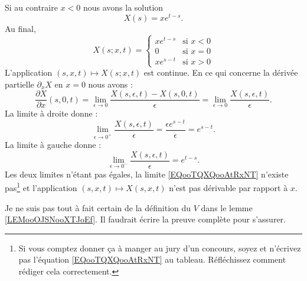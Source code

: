 \begin{example}
	Si au contraire \( x<0 \) nous avons la solution
	\begin{equation}
		X(s)=x e^{t-s}.
	\end{equation}
	Au final,
	\begin{equation}
		X(s;x,t)=
		\begin{cases}
			x e^{t-s} & \text{si } x<0 \\
			0         & \text{si }x=0  \\
			x e^{s-t} & \text{si }x>0
		\end{cases}
	\end{equation}
	L'application \( (s,x,t)\mapsto X(s;x,t)\) est continue. En ce qui concerne la dérivée partielle \( \partial_xX\) en \( x=0\) nous avons :
	\begin{equation}        \label{EQooTQXQooAtRxNT}
		\frac{ \partial X }{ \partial x }(s,0,t)=\lim_{\epsilon\to 0}\frac{ X(s,\epsilon,t)-X(s,0,t) }{ \epsilon }=\lim_{\epsilon\to 0}\frac{ X(s,\epsilon,t) }{ \epsilon }.
	\end{equation}
	La limite à droite donne :
	\begin{equation}
		\lim_{\epsilon\to 0^+}\frac{ X(s,\epsilon,t) }{ \epsilon }=\frac{ \epsilon e^{s-t} }{ \epsilon }= e^{s-t}.
	\end{equation}
	La limite à gauche donne :
	\begin{equation}
		\lim_{\epsilon\to 0^-}\frac{ X(s,\epsilon,t) }{ \epsilon }= e^{t-s}.
	\end{equation}
	Les deux limites n'étant pas égales, la limite \eqref{EQooTQXQooAtRxNT} n'existe pas\footnote{Si vous comptez donner ça à manger au jury d'un concours, soyez  et n'écrivez pas l'équation \eqref{EQooTQXQooAtRxNT} au tableau. Réfléchissez comment rédiger cela correctement.} et l'application \( (s,x,t)\mapsto X(s,x,t) \) n'est pas dérivable par rapport à \( x\).
\end{example}

\begin{probleme}		\label{PROBooYUYQooSBsrNh}
	Je ne suis pas tout à fait certain de la définition du \( V\) dans le lemme \ref{LEMooOJSNooXTJoEf}. Il faudrait écrire la preuve complète pour s'assurer.
\end{probleme}

